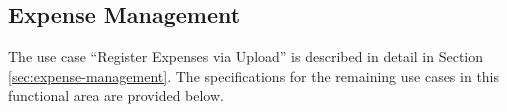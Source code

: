 \subsection{Expense Management}

The use case ``Register Expenses via Upload'' is described in detail in Section \ref{sec:expense-management}. The specifications for the remaining use cases in this functional area are provided below.










